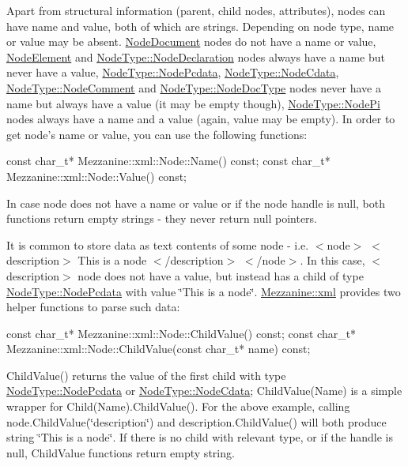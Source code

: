 Apart from structural information (parent, child nodes, attributes), nodes can have name and value, both of which are strings. Depending on node type, name or value may be absent. \hyperlink{namespaceMezzanine_1_1xml_a524d867e34ff408b8f45a51b7924cb80}{NodeDocument} nodes do not have a name or value, \hyperlink{namespaceMezzanine_1_1xml_a524d867e34ff408b8f45a51b7924cb80}{NodeElement} and \hyperlink{namespaceMezzanine_1_1xml_a524d867e34ff408b8f45a51b7924cb80}{NodeType::NodeDeclaration} nodes always have a name but never have a value, \hyperlink{namespaceMezzanine_1_1xml_a524d867e34ff408b8f45a51b7924cb80}{NodeType::NodePcdata}, \hyperlink{namespaceMezzanine_1_1xml_a524d867e34ff408b8f45a51b7924cb80}{NodeType::NodeCdata}, \hyperlink{namespaceMezzanine_1_1xml_a524d867e34ff408b8f45a51b7924cb80}{NodeType::NodeComment} and \hyperlink{namespaceMezzanine_1_1xml_a524d867e34ff408b8f45a51b7924cb80}{NodeType::NodeDocType} nodes never have a name but always have a value (it may be empty though), \hyperlink{namespaceMezzanine_1_1xml_a524d867e34ff408b8f45a51b7924cb80}{NodeType::NodePi} nodes always have a name and a value (again, value may be empty). In order to get node's name or value, you can use the following functions: 
\begin{DoxyCode}
 const char_t* Mezzanine::xml::Node::Name() const;
 const char_t* Mezzanine::xml::Node::Value() const;
\end{DoxyCode}
 In case node does not have a name or value or if the node handle is null, both functions return empty strings -\/ they never return null pointers. \par
 \par
 It is common to store data as text contents of some node -\/ i.e. $<$node$>$ $<$description$>$ This is a node $<$/description$>$ $<$/node$>$. In this case, $<$description$>$ node does not have a value, but instead has a child of type \hyperlink{namespaceMezzanine_1_1xml_a524d867e34ff408b8f45a51b7924cb80}{NodeType::NodePcdata} with value \char`\"{}This is a node\char`\"{}. \hyperlink{namespaceMezzanine_1_1xml}{Mezzanine::xml} provides two helper functions to parse such data: 
\begin{DoxyCode}
 const char_t* Mezzanine::xml::Node::ChildValue() const;
 const char_t* Mezzanine::xml::Node::ChildValue(const char_t* name) const;
\end{DoxyCode}
 ChildValue() returns the value of the first child with type \hyperlink{namespaceMezzanine_1_1xml_a524d867e34ff408b8f45a51b7924cb80}{NodeType::NodePcdata} or \hyperlink{namespaceMezzanine_1_1xml_a524d867e34ff408b8f45a51b7924cb80}{NodeType::NodeCdata}; ChildValue(Name) is a simple wrapper for Child(Name).ChildValue(). For the above example, calling node.ChildValue(\char`\"{}description\char`\"{}) and description.ChildValue() will both produce string \char`\"{}This is a node\char`\"{}. If there is no child with relevant type, or if the handle is null, ChildValue functions return empty string. \par
